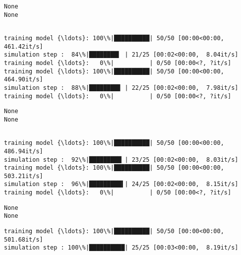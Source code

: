 \documentclass[11pt]{article}
\begin{document}
    \begin{Verbatim}[commandchars=\\\{\}]
None
None
    \end{Verbatim}

    \begin{Verbatim}[commandchars=\\\{\}]

training model {\ldots}: 100\%|██████████| 50/50 [00:00<00:00, 461.42it/s]
simulation step :  84\%|████████▍ | 21/25 [00:02<00:00,  8.04it/s]
training model {\ldots}:   0\%|          | 0/50 [00:00<?, ?it/s]
training model {\ldots}: 100\%|██████████| 50/50 [00:00<00:00, 464.90it/s]
simulation step :  88\%|████████▊ | 22/25 [00:02<00:00,  7.98it/s]
training model {\ldots}:   0\%|          | 0/50 [00:00<?, ?it/s]
    \end{Verbatim}

    \begin{Verbatim}[commandchars=\\\{\}]
None
None
    \end{Verbatim}

    \begin{Verbatim}[commandchars=\\\{\}]

training model {\ldots}: 100\%|██████████| 50/50 [00:00<00:00, 486.94it/s]
simulation step :  92\%|█████████▏| 23/25 [00:02<00:00,  8.03it/s]
training model {\ldots}: 100\%|██████████| 50/50 [00:00<00:00, 503.21it/s]
simulation step :  96\%|█████████▌| 24/25 [00:02<00:00,  8.15it/s]
training model {\ldots}:   0\%|          | 0/50 [00:00<?, ?it/s]
    \end{Verbatim}

    \begin{Verbatim}[commandchars=\\\{\}]
None
None
    \end{Verbatim}

    \begin{Verbatim}[commandchars=\\\{\}]
training model {\ldots}: 100\%|██████████| 50/50 [00:00<00:00, 501.68it/s]
simulation step : 100\%|██████████| 25/25 [00:03<00:00,  8.19it/s]
    \end{Verbatim}
\end{document}
